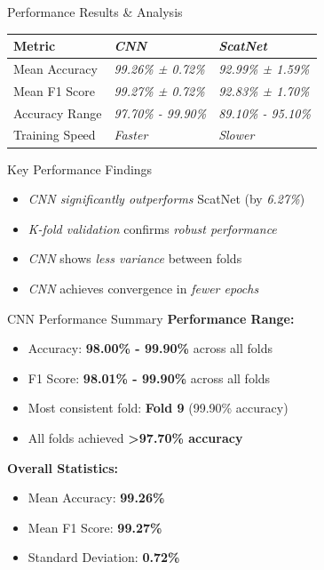\documentclass[aspectratio=169,8pt]{beamer}  %
\begin{document}
\begin{frame}{Performance Results \& Analysis}
\begin{table}
\begin{tabular}{lll}
\toprule
Metric & \emph{CNN} & \emph{ScatNet} \\
\midrule
Mean Accuracy & \emph{99.26\% ± 0.72\%} & \emph{92.99\% ± 1.59\%} \\
Mean F1 Score & \emph{99.27\% ± 0.72\%} & \emph{92.83\% ± 1.70\%} \\
Accuracy Range & \emph{97.70\% - 99.90\%} & \emph{89.10\% - 95.10\%} \\
Training Speed & \emph{Faster} & \emph{Slower} \\
\bottomrule
\end{tabular}
\end{table}

\begin{alertblock}{Key Performance Findings}
\begin{itemize}
\item \emph{CNN significantly outperforms} ScatNet (by \emph{6.27\%})
\item \emph{K-fold validation} confirms \emph{robust performance}
\item \emph{CNN} shows \emph{less variance} between folds
\item \emph{CNN} achieves convergence in \emph{fewer epochs}
\end{itemize}
\end{alertblock}
\end{frame}

\begin{frame}{CNN Performance Summary}
\textbf{Performance Range:}
\begin{itemize}
\item Accuracy: \textbf{98.00\% - 99.90\%} across all folds
\item F1 Score: \textbf{98.01\% - 99.90\%} across all folds
\item Most consistent fold: \textbf{Fold 9} (99.90\% accuracy)
\item All folds achieved \textbf{\textgreater{}97.70\% accuracy}
\end{itemize}

\textbf{Overall Statistics:}
\begin{itemize}
\item Mean Accuracy: \textbf{99.26\%}
\item Mean F1 Score: \textbf{99.27\%}
\item Standard Deviation: \textbf{0.72\%}
\end{itemize}
\end{frame}
\end{document}
